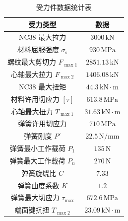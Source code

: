 \begin{table}[htbp]
    \centering
    \caption{受力件数据统计表}
    \label{tab:force_data_statistics}
    \renewcommand{\arraystretch}{1.3} %
    \begin{tabularx}{0.8\textwidth}{CC}  %
        \toprule
        受力类型 & 数据\\
        \midrule
        NC38 最大拉力 & $3000\,\text{kN}$ \\
        材料屈服强度 $\sigma_{\mathrm{s}}$ & $930\,\text{MPa}$ \\
        螺纹最大剪切力 $F_{\max1}$ & $2851.13\,\text{kN}$ \\
        心轴最大拉力 $F_{\max2}$ & $1406.08\,\text{kN}$ \\
        NC38 最大扭矩 & $44.3\,\text{kN}\cdot\text{m}$ \\
        材料许用切应力 $[\tau]$ & $613.8\,\text{MPa}$ \\
        心轴最大扭力 $T_{\max1}$ & $31.63\,\text{kN}\cdot\text{m}$ \\
        弹簧许用切应力 & $710\,\text{MPa}$ \\
        弹簧刚度 $P'$ & $22.5\,\text{N/mm}$ \\
        弹簧最小工作载荷 $P_1$ & $135\,\text{N}$ \\
        弹簧最大工作载荷 $P_n$ & $270\,\text{N}$ \\
        弹簧旋绕比 $C$ & $7.33$ \\
        弹簧曲度系数 $K$ & $1.2$ \\
        弹簧最大切应力 $\tau_{\max}$ & $672.6\,\text{MPa}$ \\
        端面键抗扭 $T_{\max2}$ & $23.09\,\text{kN}\cdot\text{m}$ \\
        \bottomrule
    \end{tabularx}
\end{table}
